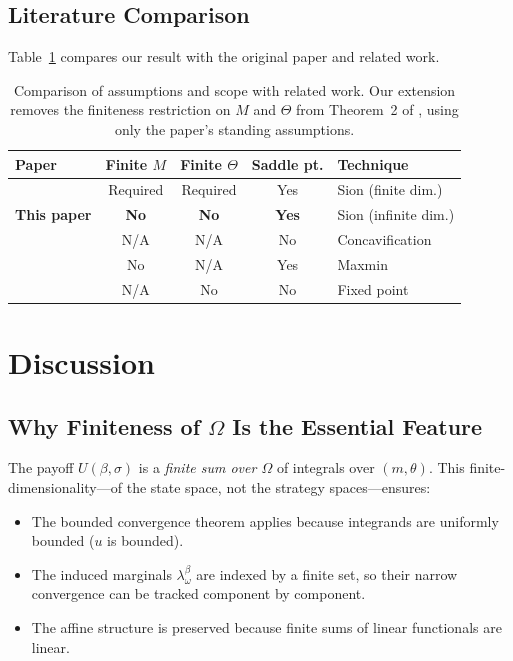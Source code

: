 \documentclass[11pt,a4paper]{article}
\theoremstyle{definition}
\begin{document}
\subsection{Literature Comparison}

Table~\ref{tab:comparison} compares our result with the original paper and related work.

\begin{table}[t]
\centering
\caption{Comparison of assumptions and scope with related work.
Our extension removes the finiteness restriction on $M$ and $\Theta$ from Theorem~2 of \citet{dworczak2026robust}, using only the paper's standing assumptions.}
\label{tab:comparison}
\begin{tabular}{@{}lcccl@{}}
\toprule
\textbf{Paper} & \textbf{Finite $M$} & \textbf{Finite $\Theta$} & \textbf{Saddle pt.} & \textbf{Technique} \\
\midrule
\citet{dworczak2026robust} & Required & Required & Yes & Sion (finite dim.) \\
\textbf{This paper} & \textbf{No} & \textbf{No} & \textbf{Yes} & Sion (infinite dim.) \\
\citet{kamenica2011bayesian} & N/A & N/A & No & Concavification \\
\citet{dworczak2022preparing} & No & N/A & Yes & Maxmin \\
\citet{crawford1982strategic} & N/A & No & No & Fixed point \\
\bottomrule
\end{tabular}
\end{table}

\section{Discussion}
\label{sec:discussion}

\subsection{Why Finiteness of $\Omega$ Is the Essential Feature}

The payoff $U(\beta,\sigma)$ is a \emph{finite sum over $\Omega$} of integrals over $(m,\theta)$.
This finite-dimensionality---of the state space, not the strategy spaces---ensures:
\begin{itemize}
  \item The bounded convergence theorem applies because integrands are uniformly bounded ($u$ is bounded).
  \item The induced marginals $\lambda_\omega^\beta$ are indexed by a finite set, so their narrow convergence can be tracked component by component.
  \item The affine structure is preserved because finite sums of linear functionals are linear.
\end{itemize}
\end{document}

